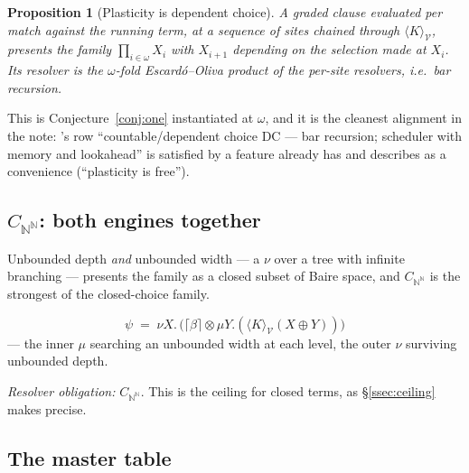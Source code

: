 \documentclass[11pt]{article}
\theoremstyle{definition}
\theoremstyle{plain}
\newtheorem{proposition}{Proposition}
\theoremstyle{remark}
\newcommand{\V}{\mathcal{V}}
\newcommand{\sumv}{\oplus}
\newcommand{\tensorv}{\otimes}
\newcommand{\crisp}[1]{\lceil #1 \rceil}
\newcommand{\DC}{\mathrm{DC}}
\newcommand{\Bai}{\mathbb{N}^{\mathbb{N}}}
\begin{document}
\begin{proposition}[Plasticity is dependent choice]\label{prop:dc}
A graded clause evaluated per match against the running term, at a sequence of sites
chained through $\langle K \rangle_\V$, presents the family
$\prod_{i \in \omega} X_i$ with $X_{i+1}$ depending on the selection made at $X_i$.
Its resolver is the $\omega$-fold Escard\'o--Oliva product of the per-site resolvers,
i.e.\ bar recursion.
\end{proposition}

\noindent
This is Conjecture~\ref{conj:one} instantiated at $\omega$, and it is the cleanest
alignment in the note: \cite{choicesched}'s row ``countable/dependent choice $\DC$ ---
bar recursion; scheduler with memory and lookahead'' is satisfied by a feature
\cite{gradedwhere} already has and describes as a convenience
(``plasticity is free'').

\subsection{$C_{\Bai}$: both engines together}\label{ssec:baire}

Unbounded depth \emph{and} unbounded width --- a $\nu$ over a tree with infinite
branching --- presents the family as a closed subset of Baire space, and
$C_{\Bai}$ is the strongest of the closed-choice family.

\[
  \psi \;=\; \nu X.\, \big( \crisp{\beta} \tensorv \mu Y.(\langle K \rangle_\V
  (X \sumv Y)) \big)
\]
--- the inner $\mu$ searching an unbounded width at each level, the outer $\nu$
surviving unbounded depth.

\emph{Resolver obligation:} $C_{\Bai}$. This is the ceiling for closed terms, as
\S\ref{ssec:ceiling} makes precise.

\subsection{The master table}\label{ssec:table}
\end{document}
